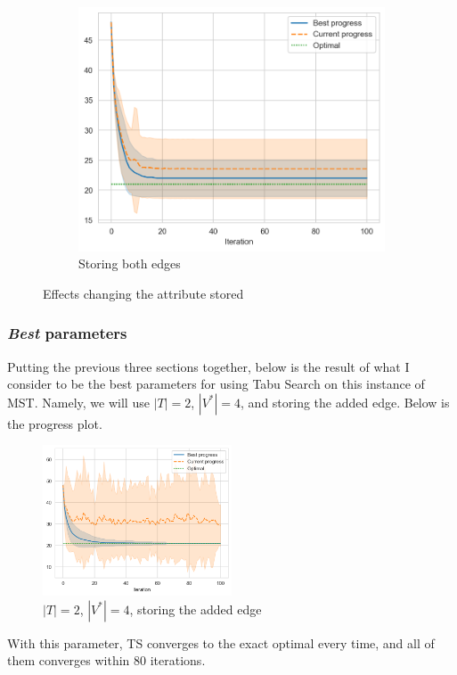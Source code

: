 \begin{figure}[ht]
\begin{subfigure}{0.45\textwidth}
        \centering
        \includegraphics[width=\textwidth]{../images/p1/both34s.png}
        \caption{Storing both edges}
    \end{subfigure}

    \caption{Effects changing the attribute stored}
    \label{fig:p1-change-attr}
\end{figure}

\subsubsection{\textit{Best} parameters}

Putting the previous three sections together, below is the result of what I consider to be the best parameters for using Tabu Search on this instance of MST. Namely, we will use \(|T| = 2\), \(|V^*| = 4\), and storing the added edge. Below is the progress plot.

\begin{figure}[ht]
    \centering
    \includegraphics[width=0.5\textwidth]{../images/p1/best.png}
    \caption{\(|T| = 2\), \(|V^*| = 4\), storing the added edge}
    \label{fig:p1-best}
\end{figure}

With this parameter, TS converges to the exact optimal every time, and all of them converges within 80 iterations.
